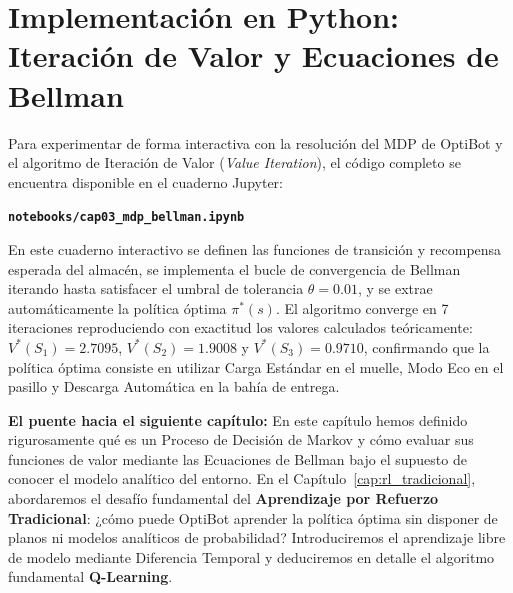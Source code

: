 \section{Implementación en Python: Iteración de Valor y Ecuaciones de Bellman}
Para experimentar de forma interactiva con la resolución del MDP de OptiBot y el algoritmo de Iteración de Valor (\textit{Value Iteration}), el código completo se encuentra disponible en el cuaderno Jupyter:
\begin{center}
  \textbf{\texttt{notebooks/cap03\_mdp\_bellman.ipynb}}
\end{center}
En este cuaderno interactivo se definen las funciones de transición y recompensa esperada del almacén, se implementa el bucle de convergencia de Bellman iterando hasta satisfacer el umbral de tolerancia $\theta = 0.01$, y se extrae automáticamente la política óptima $\pi^*(s)$. El algoritmo converge en 7 iteraciones reproduciendo con exactitud los valores calculados teóricamente: $V^*(S_1) = 2.7095$, $V^*(S_2) = 1.9008$ y $V^*(S_3) = 0.9710$, confirmando que la política óptima consiste en utilizar Carga Estándar en el muelle, Modo Eco en el pasillo y Descarga Automática en la bahía de entrega.

\begin{notabox}
\textbf{El puente hacia el siguiente capítulo:} En este capítulo hemos definido rigurosamente qué es un Proceso de Decisión de Markov y cómo evaluar sus funciones de valor mediante las Ecuaciones de Bellman bajo el supuesto de conocer el modelo analítico del entorno. En el Capítulo~\ref{cap:rl_tradicional}, abordaremos el desafío fundamental del \textbf{Aprendizaje por Refuerzo Tradicional}: ¿cómo puede OptiBot aprender la política óptima sin disponer de planos ni modelos analíticos de probabilidad? Introduciremos el aprendizaje libre de modelo mediante Diferencia Temporal y deduciremos en detalle el algoritmo fundamental \textbf{Q-Learning}.
\end{notabox}
